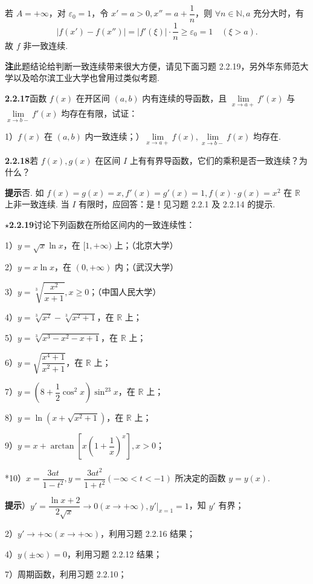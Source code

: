 \documentclass[UTF8,12pt,a4paper,fontset=fandol]{ctexart}
\begin{document}
若 $A=+\infty$，对 $\varepsilon_0=1$，令 $x'=a>0,x''=a+\dfrac1n$，则 $\forall n\in\mathbb{N},a$ 充分大时，有
\[
  |f(x')-f(x'')|=|f'(\xi)|\cdot\frac1n\ge\varepsilon_0=1\quad(\xi>a).
\]
故 $f$ 非一致连续.

\noindent\textbf{注}\quad 此题结论给判断一致连续带来很大方便，请见下面习题 2.2.19，另外华东师范大学以及哈尔滨工业大学也曾用过类似考题.

\noindent\textbf{2.2.17}\quad 函数 $f(x)$ 在开区间 $(a,b)$ 内有连续的导函数，且 $\lim\limits_{x\to a+}f'(x)$ 与 $\lim\limits_{x\to b-}f'(x)$ 均存在有限，试证：

1）$f(x)$ 在 $(a,b)$ 内一致连续；）$\lim\limits_{x\to a+}f(x),\lim\limits_{x\to b-}f(x)$ 均存在.

\noindent\textbf{2.2.18}\quad 若 $f(x),g(x)$ 在区间 $I$ 上有有界导函数，它们的乘积是否一致连续？为什么？

\noindent\textbf{提示}\quad 否. 如 $f(x)=g(x)=x,f'(x)=g'(x)=1,f(x)\cdot g(x)=x^2$ 在 $\mathbb{R}$ 上非一致连续. 当 $I$ 有限时，应回答：是！见习题 2.2.1 及 2.2.14 的提示.

\noindent\textbf{$\star$2.2.19}\quad 讨论下列函数在所给区间内的一致连续性：

1）$y=\sqrt{x}\ln x$，在 $[1,+\infty)$ 上；（北京大学）

2）$y=x\ln x$，在 $(0,+\infty)$ 内；（武汉大学）

3）$y=\sqrt[3]{\dfrac{x^2}{x+1}},x\ge0$；（中国人民大学）

4）$y=\sqrt[3]{x^2}-\sqrt[3]{x^2+1}$，在 $\mathbb{R}$ 上；

5）$y=\sqrt[3]{x^3-x^2-x+1}$，在 $\mathbb{R}$ 上；

6）$y=\sqrt{\dfrac{x^4+1}{x^2+1}}$，在 $\mathbb{R}$ 上；

7）$y=\left(8+\dfrac12\cos^2x\right)\sin^23x$，在 $\mathbb{R}$ 上；

8）$y=\ln\left(x+\sqrt{x^2+1}\right)$，在 $\mathbb{R}$ 上；

9）$y=x+\arctan\left[x\left(1+\dfrac1x\right)^x\right],x>0$；

*10）$x=\dfrac{3at}{1-t^2},y=\dfrac{3at^2}{1+t^2}(-\infty<t<-1)$ 所决定的函数 $y=y(x)$.

\noindent\textbf{提示}）$y'=\dfrac{\ln x+2}{2\sqrt{x}}\to0(x\to+\infty),y'|_{x=1}=1$，知 $y'$ 有界；

2）$y'\to+\infty(x\to+\infty)$，利用习题 2.2.16 结果；

4）$y(\pm\infty)=0$，利用习题 2.2.12 结果；

7）周期函数，利用习题 2.2.10；
\end{document}
